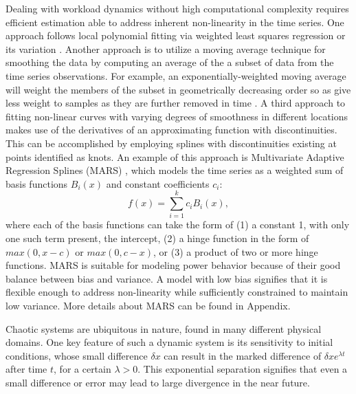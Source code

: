 \documentclass[prodmode,acmtaco,pdftex]{acmsmall}
\begin{document}
Dealing with workload dynamics without high computational complexity
requires efficient estimation able to address inherent non-linearity in
the time series.  One approach follows local polynomial fitting via
weighted least squares regression \cite{Fan1996} or its variation
\cite{Singh2009}.  Another approach is to utilize a moving average
technique for smoothing the data by computing an average of the a subset
of data from the time series observations.  For example, an
exponentially-weighted moving average will weight the members of the
subset in geometrically decreasing order so as give less weight to
samples as they are further removed in time \cite{NIST2010}. A third
approach to fitting non-linear curves with varying degrees of smoothness
in different locations makes use of the derivatives of an approximating
function with discontinuities.  This can be accomplished by employing
splines with discontinuities existing at points identified as knots.  An
example of this approach is Multivariate Adaptive Regression Splines
(MARS) \cite{Friedman1991}, which models the time series as a weighted
sum of basis functions $B_{i}(x)$ and constant coefficients $c_{i}$:
\begin{equation}
  \label{eq:mars}
  f(x)= \displaystyle\sum_{i=1}^{k}c_{i}B_{i}(x),
\end{equation}
where each of the basis functions can take the form of (1) a constant 1,
with only one such term present, the intercept, (2) a hinge function in
the form of $max(0,x - c)$ or $max(0, c - x)$, or (3) a product of two or
more hinge functions.   MARS is suitable for modeling power
behavior because of their good balance between bias and variance.
A model with low bias signifies that it is flexible enough to address
non-linearity while sufficiently constrained to maintain low variance.
More details about MARS can be found in Appendix.

Chaotic systems are ubiquitous in nature, found in many different
physical domains.  One key feature of such a
dynamic system is its sensitivity to initial conditions, whose small
difference $\delta{x}$ can result in the marked difference of
$\delta{x}e^{\lambda t}$ after time $t$, for a certain $\lambda > 0$.
This exponential separation signifies that even a small difference or
error may lead to large divergence in the near future.
\end{document}
